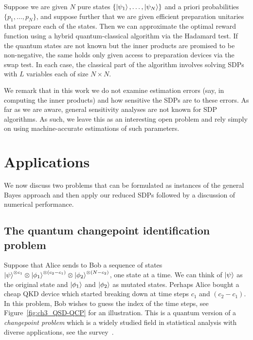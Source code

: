 \begin{strategy}
\label{strategy} 
Suppose we are given $N$ pure states $\{ \ket{\psi_1}, \ldots, \ket{\psi_N} \}$ and a priori probabilities $\{p_1, \ldots, p_N\}$, 
and suppose further that we are given efficient preparation unitaries that prepare each of the states. 
Then we can approximate the optimal reward function using a hybrid quantum-classical algorithm via the Hadamard test. 
If the quantum states are not known but the inner products are promised to be non-negative, the same holds only given access to preparation devices via the swap test.
In each case, the classical part of the algorithm involves solving SDPs with $L$ variables each of size $N \times N$.
\end{strategy}

We remark that in this work we do not examine estimation errors (say, in computing the inner products) and how sensitive the SDPs are to these errors. 
As far as we are aware, general sensitivity analyses are not known for SDP algorithms. 
As such, we leave this as an interesting open problem and rely simply on using machine-accurate estimations of such parameters.

\section{Applications}\label{sec:ch3_QSD-appln}

We now discuss two problems that can be formulated as instances of the general Bayes approach and then apply our reduced SDPs followed by a discussion of numerical performance.

\subsection{The quantum changepoint identification problem} 

Suppose that Alice sends to Bob a sequence of states $\ket{\psi}^{\otimes c_1} \otimes \ket{\phi_1}^{\otimes (c_2 - c_1)} \otimes \ket{\phi_2}^{\otimes (N - c_2)}$, one state at a time. 
We can think of $\ket{\psi}$ as the original state and $\ket{\phi_1}$ and $\ket{\phi_2}$ as mutated states. 
Perhaps Alice bought a cheap QKD device which started breaking down at time steps $c_1$ and $(c_2 - c_1)$. 
In this problem, Bob wishes to guess the index of the time steps, see Figure~\ref{fig:ch3_QSD-QCP} for an illustration. 
This is a quantum version of a \emph{changepoint problem} which is a widely studied field in statistical analysis with diverse applications, see the survey~\cite{aminikhanghahi2017survey}. 

